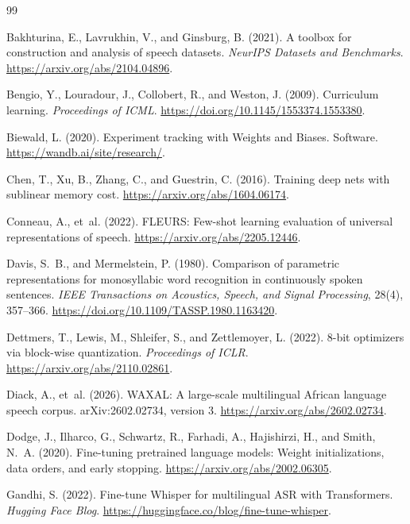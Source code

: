 {\begin{thebibliography}{99}

Bakhturina, E., Lavrukhin, V., and Ginsburg, B. (2021).
A toolbox for construction and analysis of speech datasets.
\emph{NeurIPS Datasets and Benchmarks}.
\url{https://arxiv.org/abs/2104.04896}.

Bengio, Y., Louradour, J., Collobert, R., and Weston, J. (2009).
Curriculum learning. \emph{Proceedings of ICML}.
\url{https://doi.org/10.1145/1553374.1553380}.

Biewald, L. (2020). Experiment tracking with Weights and Biases.
Software. \url{https://wandb.ai/site/research/}.

Chen, T., Xu, B., Zhang, C., and Guestrin, C. (2016).
Training deep nets with sublinear memory cost.
\url{https://arxiv.org/abs/1604.06174}.

Conneau, A., et~al. (2022). FLEURS: Few-shot learning evaluation of universal
representations of speech. \url{https://arxiv.org/abs/2205.12446}.

Davis, S.~B., and Mermelstein, P. (1980).
Comparison of parametric representations for monosyllabic word recognition
in continuously spoken sentences. \emph{IEEE Transactions on Acoustics,
Speech, and Signal Processing}, 28(4), 357--366.
\url{https://doi.org/10.1109/TASSP.1980.1163420}.

Dettmers, T., Lewis, M., Shleifer, S., and Zettlemoyer, L. (2022).
8-bit optimizers via block-wise quantization. \emph{Proceedings of ICLR}.
\url{https://arxiv.org/abs/2110.02861}.

Diack, A., et~al. (2026). WAXAL: A large-scale multilingual African language
speech corpus. arXiv:2602.02734, version 3.
\url{https://arxiv.org/abs/2602.02734}.

Dodge, J., Ilharco, G., Schwartz, R., Farhadi, A., Hajishirzi, H., and
Smith, N.~A. (2020). Fine-tuning pretrained language models: Weight
initializations, data orders, and early stopping.
\url{https://arxiv.org/abs/2002.06305}.

Gandhi, S. (2022). Fine-tune Whisper for multilingual ASR with Transformers.
\emph{Hugging Face Blog}.
\url{https://huggingface.co/blog/fine-tune-whisper}.


\end{thebibliography}}

